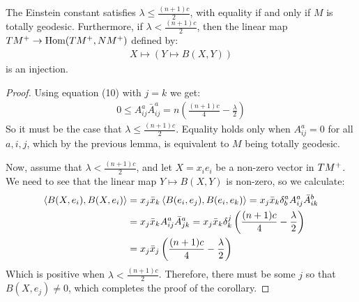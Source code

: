 \begin{cor}  The Einstein constant satisfies $\lambda \leq \frac{(n+1)c}{2}$, with equality if and only if $M$ is totally geodesic.  Furthermore, if $\lambda < \frac{(n+1)c}{2}$, then the linear map $TM^{+} \rightarrow \text{Hom} ( TM^{+}, NM^+ )$ defined by:
%
\begin{align*}
X \mapsto ( Y \mapsto B(X, Y) )
\end{align*}
%
is an injection.
%
\end{cor}

\begin{proof} Using equation (10) with $j=k$ we get:
%
\begin{align*}
0 \leq A^a_{ij} \bar{A}^a_{ij} = n \left( \frac{(n+1)c}{4} - \frac{\lambda}{2} \right)
\end{align*}
%
So it must be the case that $\lambda \leq \frac{(n+1)c}{2}$.  Equality holds only when $A^a_{ij} = 0$ for all $a,i,j$, which by the previous lemma, is equivalent to $M$ being totally geodesic.

Now, assume that $\lambda < \frac{(n+1)c}{2}$, and let $X = x_i e_i$ be a non-zero vector in $TM^{+}$.  We need to see that the linear map $Y \mapsto B(X,Y)$ is non-zero, so we calculate:
%
\begin{align*}
\left\langle B(X, e_i), B(X, e_i) \right\rangle &= x_j \bar{x}_k \left\langle B(e_i, e_j), B(e_i, e_k) \right\rangle = x_j \bar{x}_k \delta^a_b A^a_{ij} \bar{A}^b_{ik} \\
&= x_j \bar{x}_k A^a_{ij} \bar{A}^a_{jk} = x_j \bar{x}_k \delta^j_k \left( \frac{(n+1)c}{4} - \frac{\lambda}{2} \right) \\
&= x_j \bar{x}_j \left( \frac{(n+1)c}{4} - \frac{\lambda}{2} \right)
\end{align*}
%
Which is positive when $\lambda < \frac{(n+1)c}{2}$.  Therefore, there must be some $j$ so that $B(X,e_j) \neq 0$, which completes the proof of the corollary.
%
\end{proof}

